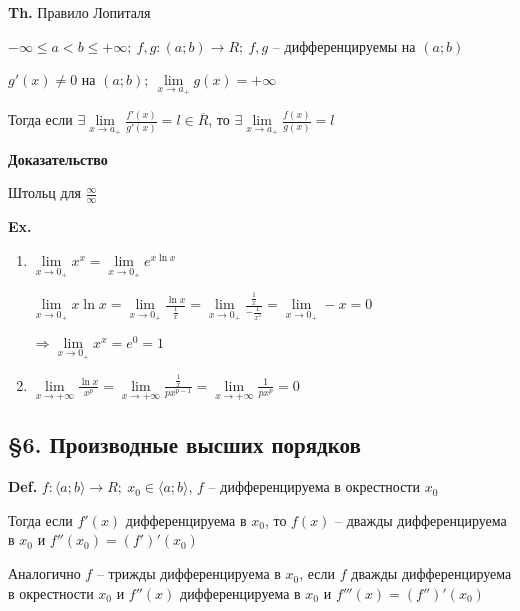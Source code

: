 \documentclass[14pt, letter paper]{article}
\newcommand{\q}[1]{\langle #1 \rangle}
\begin{document}
\vspace{5mm}

\textbf{Th.} Правило Лопиталя

$- \infty \leq a < b \leq + \infty;\ f, g : (a; b) \rightarrow R;\ f, g$ -- дифференцируемы на $(a; b)$

$g'(x) \neq 0$ на $(a; b);\ \lim\limits_{x \rightarrow a_+} g(x) = + \infty$

Тогда если $\exists \lim\limits_{x \rightarrow a_+} \frac{f'(x)}{g'(x)} = l \in \overline{R}$, то $\exists \lim\limits_{x \rightarrow a_+} \frac{f(x)}{g(x)} = l$

\begin{center}
    \textbf{Доказательство}
\end{center}

Штольц для $\frac{\infty}{\infty}$

\vspace{5mm}

\textbf{Ex.} \begin{enumerate}
    \item $\lim\limits_{x \rightarrow 0_+} x^x = \lim\limits_{x \rightarrow 0_+} e^{x\ln{x}}$
    
    $\lim\limits_{x \rightarrow 0_+} x\ln{x} = \lim\limits_{x \rightarrow 0_+} \frac{\ln{x}}{\frac{1}{x}} = \lim\limits_{x \rightarrow 0_+} \frac{\frac{1}{x}}{-\frac{1}{x^2}} = \lim\limits_{x \rightarrow 0_+} -x = 0$

    $\Rightarrow \lim\limits_{x \rightarrow 0_+} x^x = e^0 = 1$

    \item $\lim\limits_{x \rightarrow + \infty} \frac{\ln{x}}{x^p} = \lim\limits_{x \rightarrow + \infty} \frac{\frac{1}{x}}{px^{p - 1}} = \lim\limits_{x \rightarrow + \infty} \frac{1}{px^p} = 0$ 
\end{enumerate}

\begin{center}
    \subsection*{\S 6. Производные высших порядков}
\end{center}

\textbf{Def.} $f : \q{a; b} \rightarrow R;\ x_0 \in \q{a; b}$, $f$ -- дифференцируема в окрестности $x_0$

Тогда если $f'(x)$ дифференцируема в $x_0$, то $f(x)$ -- дважды дифференцируема в $x_0$ и $f''(x_0) = (f')'(x_0)$

Аналогично $f$ -- трижды дифференцируема в $x_0$, если $f$ дважды дифференцируема в окрестности $x_0$ и $f''(x)$ дифференцируема в $x_0$ и $f'''(x) = (f'')'(x_0)$
\end{document}
